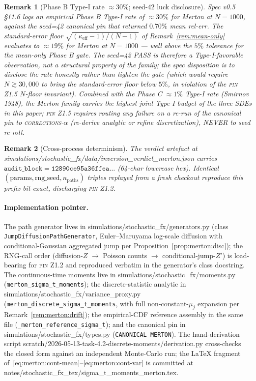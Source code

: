 \documentclass[11pt,letterpaper]{article}
\newtheorem{remark}{Remark}[section]
\newcommand{\PinZ}[1]{\textsc{pin Z1.#1}}
\begin{document}
\begin{remark}[Phase B Type-I rate $\approx 30\%$; seed-42 luck disclosure]
\label{rem:merton:type-i}
Spec v0.5 \S11.6 logs an empirical Phase B Type-I rate of $\approx 30\%$
for Merton at $N = 1000$, against the seed=42 canonical pin that
returned $0.70\%$ mean rel-err. The standard-error floor
$\sqrt{(\kappa_{\text{eff}} - 1)/(N - 1)}$ of Remark~\ref{rem:mean-only}
evaluates to $\approx 19\%$ for Merton at $N = 1000$ — well above the
$5\%$ tolerance for the mean-only Phase B gate. The seed=42 PASS is
therefore a Type-I-favorable observation, not a structural property of
the family; the spec disposition is to disclose the rate honestly rather
than tighten the gate (which would require $N \gtrsim 30{,}000$ to bring
the standard-error floor below $5\%$, in violation of the \PinZ{5}
$N$-floor invariant). Combined with the Phase C $\approx 1\%$ Type-I rate
(Smirnov 1948), the Merton family carries the highest joint Type-I
budget of the three SDEs in this paper; \PinZ{5} requires routing any
failure on a re-run of the canonical pin to \textsc{corrections-$\alpha$}
(re-derive analytic or refine discretization), NEVER to seed re-roll.
\end{remark}

\begin{remark}[Cross-process determinism]
\label{rem:merton:audit}
The verdict artefact at
\textsf{simulations/stochastic\_fx/data/inversion\_verdict\_merton.json}
carries
\(
    \texttt{audit\_block} = \texttt{12890ce95a36ffea}\ldots
\)
(64-char lowercase hex). Identical
$(\text{params}, \text{rng\_seed}, n_{\text{paths}})$ triples replayed
from a fresh checkout reproduce this prefix bit-exact, discharging
\PinZ{2}.
\end{remark}

\paragraph{Implementation pointer.}
The path generator lives in
\textsf{simulations/stochastic\_fx/generators.py}
(class \texttt{JumpDiffusionPathGenerator}, Euler--Maruyama log-scale
diffusion with conditional-Gaussian aggregated jump per
Proposition~\ref{prop:merton:disc}); the RNG-call order
(diffusion-$Z$ $\to$ Poisson counts $\to$ conditional-jump-$Z'$) is
load-bearing for \PinZ{2} and reproduced verbatim in the generator's
class docstring. The continuous-time moments live in
\textsf{simulations/stochastic\_fx/moments.py}
(\texttt{merton\_sigma\_t\_moments}); the discrete-statistic analytic
in \textsf{simulations/stochastic\_fx/variance\_proxy.py}
(\texttt{merton\_discrete\_sigma\_t\_moments}, with full
non-constant-$\mu_{j}$ expansion per Remark~\ref{rem:merton:drift});
the empirical-CDF reference assembly in the same file
(\texttt{\_merton\_reference\_sigma\_t}); and the canonical pin in
\textsf{simulations/stochastic\_fx/types.py}
(\texttt{CANONICAL\_MERTON}). The hand-derivation script
\textsf{scratch/2026-05-13-task-4.2-discrete-moments/derivation.py}
cross-checks the closed form against an independent Monte-Carlo run;
the LaTeX fragment of~\eqref{eq:merton:cont-mean}--\eqref{eq:merton:cont-var}
is committed at
\textsf{notes/stochastic\_fx\_tex/sigma\_t\_moments\_merton.tex}.
\end{document}
